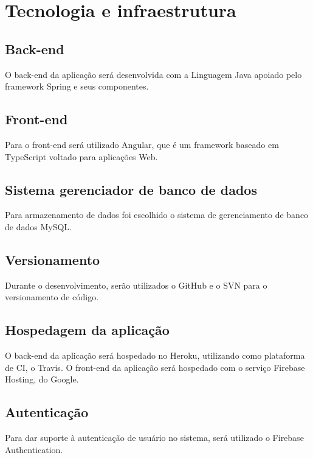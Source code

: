 \chapter{Tecnologia e infraestrutura}
\section{Back-end}
O back-end da aplicação será desenvolvida com a Linguagem Java apoiado pelo framework Spring e seus componentes. 

\section{Front-end}
Para o front-end será utilizado Angular, que é um framework baseado em TypeScript voltado para aplicações Web.

\section{Sistema gerenciador de banco de dados}
Para armazenamento de dados foi escolhido o sistema de gerenciamento de banco de dados MySQL.

\section{Versionamento}
Durante o desenvolvimento, serão utilizados o GitHub e o SVN para o versionamento de código.

\section{Hospedagem da aplicação}
O back-end da aplicação será hospedado no Heroku, utilizando como plataforma de CI, o Travis. O front-end da aplicação será hospedado com o serviço Firebase Hosting, do Google.

\section{Autenticação}
Para dar suporte à autenticação de usuário no sistema, será utilizado o Firebase Authentication.